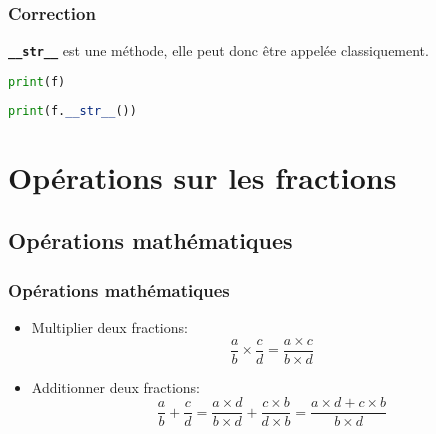 \documentclass[svgnames,11pt]{beamer}
\begin{document}
\begin{frame}[fragile]
    \frametitle{Correction}

    \begin{aretenir}[Remarque]
\textbf{\texttt{\_\_str\_\_}} est une méthode, elle peut donc être appelée classiquement.
\begin{center}
\begin{lstlisting}[language=Python , basicstyle=\ttfamily\small, xleftmargin=2em, xrightmargin=1em]
print(f)
\end{lstlisting}
\begin{lstlisting}[language=Python , basicstyle=\ttfamily\small, xleftmargin=2em, xrightmargin=1em]
print(f.__str__())
\end{lstlisting}
\label{CODE}
\end{center}
    \end{aretenir}

\end{frame}
\section{Opérations sur les fractions}
\subsection{Opérations mathématiques}
\begin{frame}
    \frametitle{Opérations mathématiques}

    \begin{itemize}
        \item<1-> Multiplier deux fractions:
        $$\frac{a}{b}×\frac{c}{d}=\frac{a×c}{b×d}$$
        \item<2-> Additionner deux fractions:
        $$\frac{a}{b}+\frac{c}{d}=\frac{a×d}{b×d}+\frac{c×b}{d×b}=\frac{a×d+c×b}{b×d}$$
    \end{itemize}

\end{frame}
\end{document}
